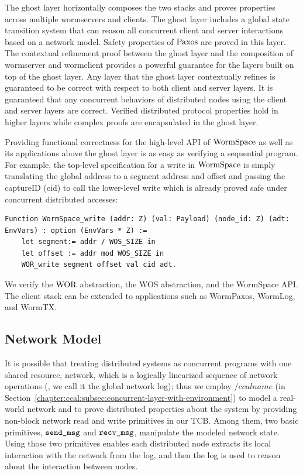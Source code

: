 The ghost layer horizontally composes the two stacks and proves properties across multiple wormservers and clients.
The ghost layer includes a global state transition system that can reason all concurrent client and server interactions based on a network model. 
Safety properties of $\mathrm{Paxos}$ are proved in this layer.
The contextual refinement proof between the ghost layer and the composition of wormserver and wormclient provides a powerful guarantee 
for  the layers built on top of the ghost layer. 
Any layer that the ghost layer contextually refines is guaranteed to be correct with respect to both client and server layers. 
It is guaranteed that any concurrent behaviors of distributed nodes using the client and server layers are correct. 
Verified distributed protocol properties hold in higher layers while complex proofs are encapsulated in the ghost layer.

Providing functional correctness for the high-level API of $\mathrm{WormSpace}$ as well as its applications
above the ghost layer is as easy as verifying a sequential program.
For example, the top-level specification for a write in $\mathrm{WormSpace}$ is simply translating the global address to a segment address and offset and 
passing the captureID (cid) to call the lower-level write which is already proved safe under concurrent distributed accesses:
\begin{lstlisting}
Function WormSpace_write (addr: Z) (val: Payload) (node_id: Z) (adt: EnvVars) : option (EnvVars * Z) :=
    let segment:= addr / WOS_SIZE in 
    let offset := addr mod WOS_SIZE in
    WOR_write segment offset val cid adt.
\end{lstlisting}
We verify the $\mathrm{WOR}$ abstraction, the WOS abstraction, and the WormSpace API.
The client stack can be extended to applications such as WormPaxos, WormLog, and WormTX. 

\subsection{Network Model}
\label{subsec:network_modeling}

It is possible that treating distributed systems as concurrent programs with one shared resource, network, which is
a logically linearized sequence of network operations (\ie, we call it the global network log);
thus we employ $/ccalname$ (in Section~\ref{chapter:ccal:subsec:concurrent-layer-with-environment})
to model a real-world network and to prove distributed properties about the system
by providing non-block network read and write primitives in our TCB. 
Among them, two basic primitives, ${\mathrm{\texttt{send\_msg}}}$ and ${\mathrm{\texttt{recv\_msg}}}$, 
manipulate the modeled network state. 
Using those two primitives enables each distributed node  extracts its local interaction with the network from the log, 
and then the log is used to reason about the interaction between nodes.

